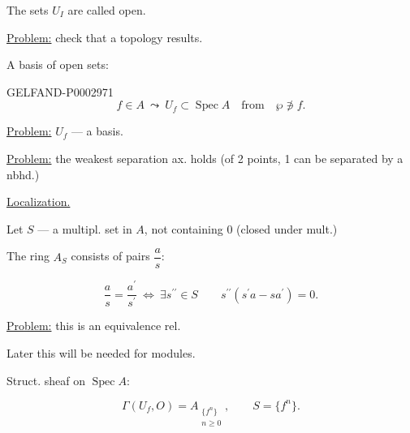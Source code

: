 The sets $U_I$ are called open.



\hfill{}

\underline{Problem:} check that a topology results.

A basis of open sets:

\begin{GelfandAdjacentEvidence}{GELFAND-P000297}{1}
\begin{equation*}f\in A\ \leadsto\ U_f\subset\operatorname{Spec}A\quad\text{from}\quad\wp\not\ni f.\end{equation*}

\end{GelfandAdjacentEvidence}


\underline{Problem:} $U_f$ --- a basis.

\underline{Problem:} the weakest separation ax. holds
(of 2 points, 1 can be separated by a nbhd.)

\underline{Localization.}

Let $S$ --- a multipl. set in $A$, not containing $0$ (closed under mult.)

The ring $A_S$ consists of pairs $\dfrac a s$:

\begin{equation*}\frac a s=\frac{a^{\prime}}{s^{\prime}}\ \Longleftrightarrow\ \exists s^{\prime\prime}\in S\qquad s^{\prime\prime}(s^{\prime}a-sa^{\prime})=0.\end{equation*}

\underline{Problem:} this is an equivalence rel.

Later this will be needed for modules.

Struct. sheaf on $\operatorname{Spec}A$:

\begin{equation*}\Gamma (U_f, O)=A_{\substack{\{f^n\}\\n\ge0}},\qquad S=\{f^n\}.\end{equation*}

